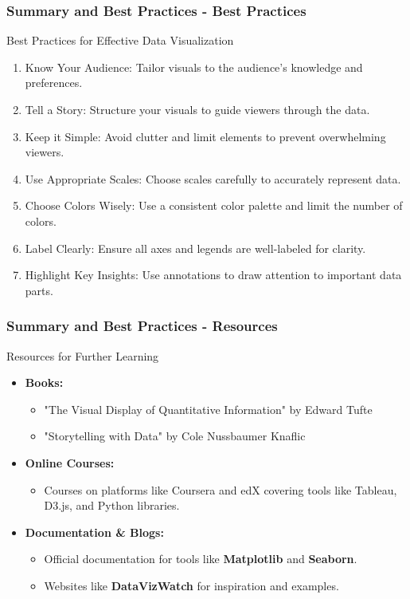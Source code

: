 \documentclass[aspectratio=169]{beamer}
\begin{document}
\begin{frame}[fragile]
    \frametitle{Summary and Best Practices - Best Practices}
    \begin{block}{Best Practices for Effective Data Visualization}
        \begin{enumerate}
            \item Know Your Audience: Tailor visuals to the audience's knowledge and preferences.
            \item Tell a Story: Structure your visuals to guide viewers through the data.
            \item Keep it Simple: Avoid clutter and limit elements to prevent overwhelming viewers.
            \item Use Appropriate Scales: Choose scales carefully to accurately represent data.
            \item Choose Colors Wisely: Use a consistent color palette and limit the number of colors.
            \item Label Clearly: Ensure all axes and legends are well-labeled for clarity.
            \item Highlight Key Insights: Use annotations to draw attention to important data parts.
        \end{enumerate}
    \end{block}
\end{frame}

\begin{frame}[fragile]
    \frametitle{Summary and Best Practices - Resources}
    \begin{block}{Resources for Further Learning}
        \begin{itemize}
            \item \textbf{Books:}
                \begin{itemize}
                    \item "The Visual Display of Quantitative Information" by Edward Tufte
                    \item "Storytelling with Data" by Cole Nussbaumer Knaflic
                \end{itemize}
            \item \textbf{Online Courses:}
                \begin{itemize}
                    \item Courses on platforms like Coursera and edX covering tools like Tableau, D3.js, and Python libraries.
                \end{itemize}
            \item \textbf{Documentation \& Blogs:}
                \begin{itemize}
                    \item Official documentation for tools like \textbf{Matplotlib} and \textbf{Seaborn}.
                    \item Websites like \textbf{DataVizWatch} for inspiration and examples.
                \end{itemize}
        \end{itemize}
    \end{block}
\end{frame}
\end{document}
